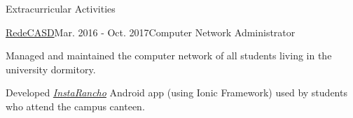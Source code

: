 \documentclass{resume} %
\begin{document}
\begin{rSection}{Extracurricular Activities}

\begin{rSubsection}{\href{http://www.aeitaonline.com.br/wiki/index.php?title=RedeCASD}{RedeCASD}}{Mar. 2016 - Oct. 2017}{Computer Network Administrator}{}
\item Managed and maintained the computer network of all students living in the university dormitory.
\item Developed \href{https://github.com/GuiPCLeao/InstaRancho}{\textit{InstaRancho}} Android app (using Ionic Framework) used by students who attend the campus canteen.
\end{rSubsection}




\end{rSection}

\vspace{-0.3cm}


\end{document}
